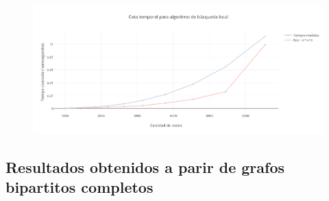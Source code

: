  \begin{figure}[H]
    \begin{center}
  	\includegraphics[width=18cm]{imagenes/Ej5/TiemposLocalCompleto.png}
 	\label{TiemposLocalCompleto}
    \end{center}
  \end{figure}

\subsection {Resultados obtenidos a parir de grafos bipartitos completos} 